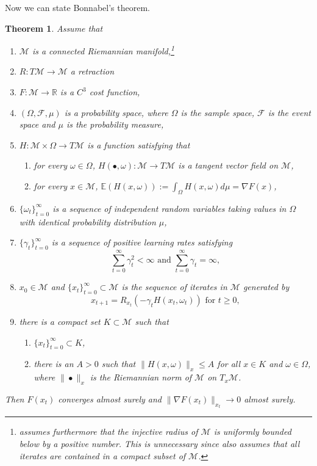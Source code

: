 \documentclass{amsart}
\newcommand{\E}{\mathbb{E}}
\newcommand{\R}{\mathbb{R}}
\newcommand{\fil}{\mathcal{F}}
\newcommand{\M}{\mathcal{M}}
\newcommand{\g}{\gamma}
\theoremstyle{plain}
\newtheorem{theorem}{Theorem}[section]
\theoremstyle{definition}
\theoremstyle{remark}
\numberwithin{theorem}{section}
\numberwithin{equation}{section}
\begin{document}
Now we can state Bonnabel's theorem.

\begin{theorem}\label{THM-Bonnabel}\cite[Theorem 2]{Bonnabel}
Assume that
\begin{enumerate}
  \item $\M$ is a connected Riemannian manifold,\footnote{\cite[Theorem 2]{Bonnabel} assumes furthermore that the injective radius of $\M$ is uniformly bounded below by a positive number. This is unnecessary since \cite[Theorem 2]{Bonnabel} also assumes that all iterates are contained in a compact subset of $\M$.}
	\item $R:T\M \rightarrow \M$ a retraction
	\item $F:\M\rightarrow \R$ is a $C^3$ cost function,
	\item $(\Omega,\fil, \mu)$ is a probability space, where $\Omega$ is the sample space, $\fil$ is the event space and $\mu$ is the probability measure,
	\item $H:\M \times \Omega \rightarrow T\M$ is a function satisfying that
	\begin{enumerate}
		\item for every $\omega \in \Omega$, $H(\bullet, \omega): \M\rightarrow T\M$ is a tangent vector field on $\M$,
		\item for every $x \in \M$, $\E(H(x, \omega)) :=\int_\Omega H(x, \omega) d\mu = \nabla F(x)$, 
	\end{enumerate}
	\item $\{\omega_t\}_{t=0}^\infty$ is a sequence of independent random variables taking values in $\Omega$ with identical probability distribution $\mu$,
	\item $\{\g_t\}_{t=0}^\infty$ is a sequence of positive learning rates satisfying 
	\begin{equation}\label{standard-condition-learning-rates}
	\sum_{t=0}^\infty \g_t^2 < \infty \text{ and } \sum_{t=0}^\infty \g_t = \infty,
	\end{equation}
	\item $x_0 \in \M$ and $\{x_t\}_{t=0}^\infty \subset \M$ is the sequence of iterates in $\M$ generated by
	\begin{equation}\label{eq-SGD-update}
	x_{t+1} = R_{x_t}(-\g_t H(x_t,\omega_t)) \text{ for } t \geq 0, 
	\end{equation}
	\item there is a compact set $K\subset \M$ such that
	\begin{enumerate}
		\item $\{x_t\}_{t=0}^\infty \subset K$,
		\item there is an $A>0$ such that $\| H(x,\omega)\|_x \leq A$ for all $x \in K$ and $\omega \in \Omega$, where $\| \bullet\|_x$ is the Riemannian norm of $\M$ on $T_x \M$.
	\end{enumerate}
\end{enumerate}
Then $F(x_t)$ converges almost surely and $\|\nabla F(x_t)\|_{x_t} \rightarrow 0$ almost surely. 
\end{theorem}
\end{document}
